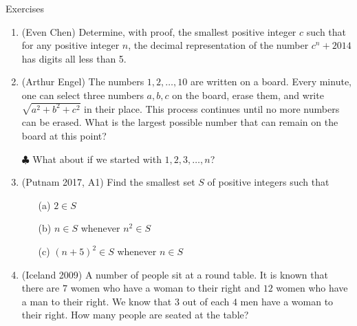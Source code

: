 \begin{xcb}{Exercises}
\begin{enumerate}
\item (Even Chen)  Determine, with proof, the smallest positive integer 
\(c\) such that for any positive integer \(n\), the decimal representation of the number 
\(c^n+2014\) has digits all less than 5.
\begin{hint}
\end{hint}

\item (Arthur Engel)  The numbers \(1, 2, \dots, 10\) are written on a board. 
Every minute, one can select three numbers \(a, b, c\) on the board, erase them, and write 
\(\sqrt{a^2+b^2+c^2}\) in their place. 
This process continues until no more numbers can be erased. 
What is the largest possible number that can remain on the board at this point? 

\(\clubsuit\) What about if we started with \(1, 2, 3, \ldots, n\)?
\begin{hint}
\end{hint}

\item (Putnam 2017, A1)  Find the smallest set \(S\) of positive integers such that
\begin{enumerate}
    \item[(a)] \(2 \in S\)
    \item[(b)] \(n \in S\) whenever \(n^2 \in S\)
    \item[(c)] \((n+5)^2 \in S\) whenever \(n \in S\) 
\end{enumerate}

\begin{hint}
\end{hint}

\item  (Iceland 2009)  A number of people sit at a round table. 
It is known that there are \(7\) women who have a woman to their right and 
\(12\) women who have a man to their right. 
We know that \(3\) out of each \(4\) men have a woman to their right. 
How many people are seated at the table?
\begin{hint}
\end{hint}
\end{enumerate}
\end{xcb}